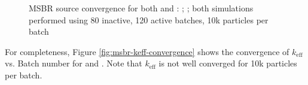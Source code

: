 \begin{figure}[htpb]
    \centering
    \caption[MSBR source convergence]{MSBR source convergence
        for both \OpenMC and \SerpentTWO:
         \OpenMC;
         \SerpentTWO;
        both simulations performed using 80 inactive, 120 active batches,
        10k particles per batch
    }
    \label{fig:msbr-source-convergence}
\end{figure}

For completeness, Figure \ref{fig:msbr-keff-convergence} shows the convergence
of $k_{\text{eff}}$ vs. Batch number for \OpenMC and \SerpentTWO. Note that
$k_{\text{eff}}$ is not well converged for 10k particles per batch.

